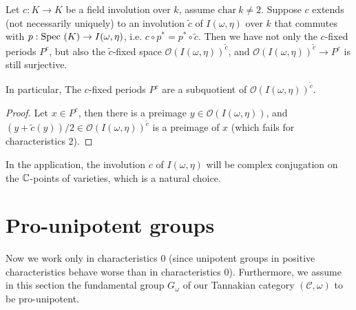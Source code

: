 \begin{lemma}
 Let $c : K \to K$ be a field involution over $k$, assume $\mathrm{char~} k \neq 2$. Suppose $c$ extends (not necessarily uniquely) to an involution $\tilde{c}$ of $I(\omega,\eta)$ over $k$ that commutes with $p : \mathrm{Spec}~(K) \to I(\omega,\eta)$, i.e. $c \circ p^\ast = p^\ast \circ \tilde{c}$.
Then we have not only the $c$-fixed periods $P^c$, but also the $\tilde{c}$-fixed space $\mathcal{O}(I(\omega,\eta))^{\tilde{c}}$,
and $\mathcal{O}(I(\omega,\eta))^{\tilde{c}} \to P^c$ is still surjective.

In particular,
The $c$-fixed periods $P^c$ are a subquotient of $\mathcal{O}(I(\omega,\eta))^{\tilde{c}}$.
\end{lemma}
\begin{proof}
 Let $x \in P^c$, then there is a preimage $y \in \mathcal{O}(I(\omega,\eta))$, and $(y+\tilde{c}(y))/2 \in \mathcal{O}(I(\omega,\eta))^{\tilde{c}}$ is a preimage of $x$ (which fails for characteristics $2$).
\end{proof}


 In the application, the involution $c$ of $I(\omega,\eta)$ will be complex conjugation on the $\mathbb{C}$-points of varieties, which is a natural choice.





























\section{Pro-unipotent groups}

Now we work only in characteristics $0$ (since unipotent groups in positive characteristics behave worse than in characteristics $0$).
Furthermore, we assume in this section the fundamental group $G_\omega$ of our Tannakian category $(\mathcal{C},\omega)$ to be pro-unipotent.


